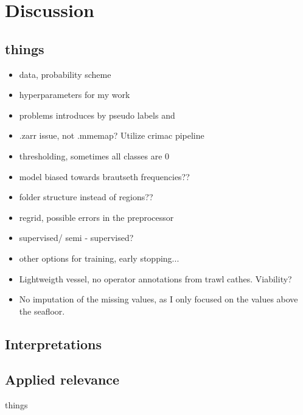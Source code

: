 \chapter{Discussion}
    \section{things}
        \begin{itemize}
            \item data, probability scheme
            \item hyperparameters for my work
            \item problems introduces by pseudo labels and 
            \item .zarr issue, not .mmemap? Utilize crimac pipeline
            \item thresholding, sometimes all classes are 0
            \item model biased towards brautseth frequencies??
            \item folder structure instead of regions??
            \item regrid, possible errors in the preprocessor 
            \item supervised/ semi - supervised? 
            \item other options for training, early stopping...
            \item Lightweigth vessel, no operator annotations from trawl cathes. Viability?
            \item No imputation of the missing values, as I only focused on the values above the seafloor.
        \end{itemize}

    \section{Interpretations}
    \section{Applied relevance}
        things
    